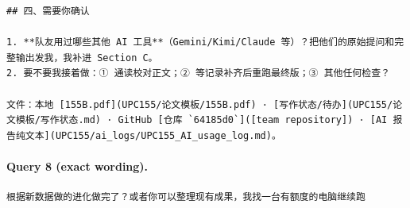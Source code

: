 \documentclass[UTF8,10pt]{ctexart}
\begin{document}
\begin{Verbatim}[breaklines=true,breakanywhere=true,fontsize=\scriptsize,frame=single,framesep=2pt]
## 四、需要你确认

1. **队友用过哪些其他 AI 工具**（Gemini/Kimi/Claude 等）？把他们的原始提问和完整输出发我，我补进 Section C。
2. 要不要我接着做：① 通读校对正文；② 等记录补齐后重跑最终版；③ 其他任何检查？

文件：本地 [155B.pdf](UPC155/论文模板/155B.pdf) · [写作状态/待办](UPC155/论文模板/写作状态.md) · GitHub [仓库 `64185d0`]([team repository]) · [AI 报告纯文本](UPC155/ai_logs/UPC155_AI_usage_log.md)。
\end{Verbatim}

\paragraph{Query 8 (exact wording).}
\begin{Verbatim}[breaklines=true,breakanywhere=true,fontsize=\scriptsize,frame=single,framesep=2pt]
根据新数据做的进化做完了？或者你可以整理现有成果，我找一台有额度的电脑继续跑
\end{Verbatim}
\end{document}
